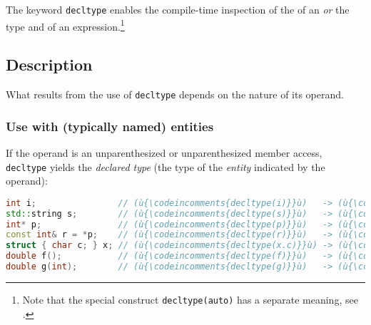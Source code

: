

The keyword \lstinline!decltype! enables the compile-time inspection of the  of an  \emph{or} the type and
 of an expression.\footnote{Note that the special construct \lstinline!decltype(auto)! has a separate meaning, see .}

\subsection[Description]{Description}\label{description}

What results from the use of \lstinline!decltype! depends on the nature of
its operand.

\subsubsection[Use with (typically named) entities]{Use with (typically named) entities}\label{use-with-(typically-named)-entities}

If the operand is an unparenthesized  or unparenthesized member access, \lstinline!decltype! yields the \emph{declared type} (the type of the \emph{entity} indicated by the operand):


\begin{lstlisting}[language=C++]
int i;                // (ù{\codeincomments{decltype(i)}}ù)   -> (ù{\codeincomments{int}}ù)
std::string s;        // (ù{\codeincomments{decltype(s)}}ù)   -> (ù{\codeincomments{std::string}}ù)
int* p;               // (ù{\codeincomments{decltype(p)}}ù)   -> (ù{\codeincomments{int}}ù)*
const int& r = *p;    // (ù{\codeincomments{decltype(r)}}ù)   -> (ù{\codeincomments{const int\&}}ù)
struct { char c; } x; // (ù{\codeincomments{decltype(x.c)}}ù) -> (ù{\codeincomments{char}}ù)
double f();           // (ù{\codeincomments{decltype(f)}}ù)   -> (ù{\codeincomments{double()}}ù)
double g(int);        // (ù{\codeincomments{decltype(g)}}ù)   -> (ù{\codeincomments{double(int)}}ù)
\end{lstlisting}
    

